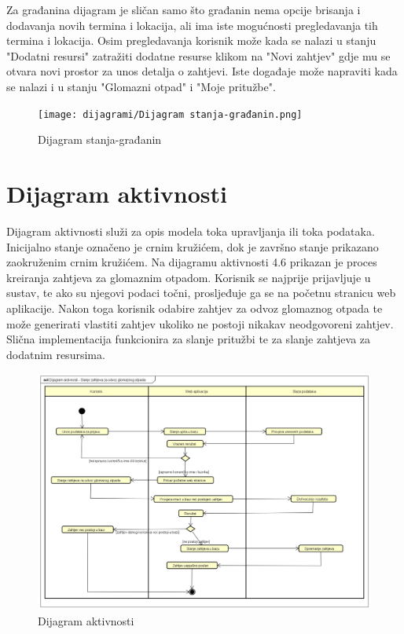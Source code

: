 		Za građanina dijagram je sličan samo što građanin nema opcije brisanja i dodavanja novih termina i lokacija, ali ima iste mogućnosti pregledavanja tih termina i lokacija. Osim pregledavanja korisnik može kada se nalazi u stanju "Dodatni resursi" zatražiti dodatne resurse klikom na "Novi zahtjev" gdje mu se otvara novi prostor za unos detalja o zahtjevi. Iste događaje može napraviti kada se nalazi i u stanju "Glomazni otpad" i "Moje pritužbe".
		\begin{figure}[H]
			\texttt{[image: dijagrami/Dijagram stanja-građanin.png]}
			\centering
			\caption{Dijagram stanja-građanin}
			\label{fig:dijagram_stanja-građanin}
		\end{figure}
%			
			\eject 
%		
		\section{Dijagram aktivnosti}
			
			
			 Dijagram aktivnosti služi za opis modela toka upravljanja ili toka podataka. Inicijalno stanje označeno je crnim kružićem, dok je završno stanje prikazano zaokruženim crnim kružićem. Na dijagramu aktivnosti 4.6 prikazan je proces kreiranja zahtjeva za glomaznim otpadom. Korisnik se najprije prijavljuje u sustav, te ako su njegovi podaci točni, prosljeđuje ga se na početnu stranicu web aplikacije. Nakon toga korisnik odabire zahtjev za odvoz glomaznog otpada te može generirati vlastiti zahtjev ukoliko ne postoji nikakav neodgovoreni zahtjev. Slična implementacija funkcionira za slanje pritužbi te za slanje zahtjeva za dodatnim resursima.
			 
			 
			 \begin{figure}[H]
			 	\includegraphics[width=\linewidth]{dijagrami/Dijagram aktivnosti.png}
			 	\centering
			 	\caption{Dijagram aktivnosti}
			 	\label{fig:dijagram_aktivnosti}
			 \end{figure}
			 
